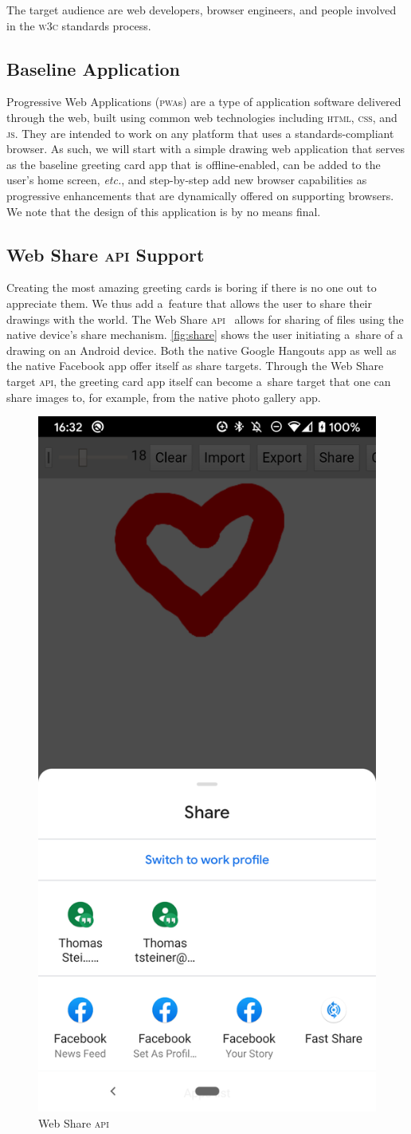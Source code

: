 \documentclass[sigconf, anonymous]{acmart}
\begin{document}
The target audience are web developers, browser engineers,
and people involved in the \textsc{w3c} standards process.

\subsection{Baseline Application}

Progressive Web Applications (\textsc{pwa}s) are a type of application software
delivered through the web, built using common web technologies
including \textsc{html}, \textsc{css}, and \textsc{js}.
They are intended to work on any platform that uses a standards-compliant browser.
As such, we will start with a simple drawing web application
that serves as the baseline greeting card app that is offline-enabled,
can be added to the user's home screen, \textit{etc.},
and step-by-step add new browser capabilities
as progressive enhancements that are dynamically offered on supporting browsers.
We note that the design of this application is by no means final.

\subsection{Web Share \textsc{api} Support}

Creating the most amazing greeting cards is boring if there is no one out to appreciate them.
We thus add a~feature that allows the user to share their drawings with the world.
The Web Share \textsc{api}~\cite{giuca2017webshare} allows for sharing of files
using the native device's share mechanism.
\autoref{fig:share} shows the user initiating a~share of a drawing on an Android device.
Both the native Google Hangouts app as well as the native Facebook app offer itself
as share targets.
Through the Web Share target \textsc{api}, the greeting card app itself can become a~share target
that one can share images to, for example, from the native photo gallery app.

\begin{figure}[hbt]
  \includegraphics[width=0.3\columnwidth]{share.png}
  \caption{Web Share \textsc{api}}
  \label{fig:share}
\end{figure}
\end{document}

